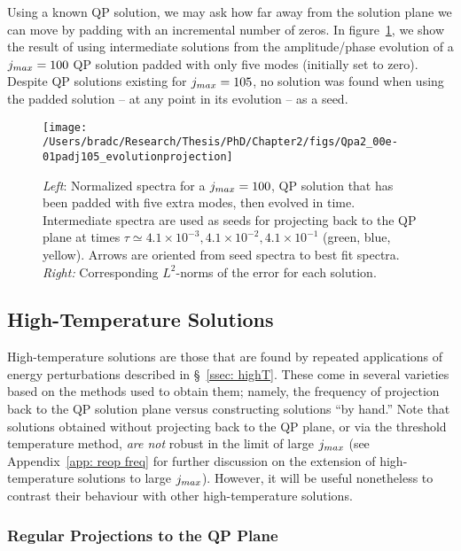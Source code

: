 \documentclass[../PhD.tex]{subfiles}
\begin{document}
Using a known QP solution, we may ask how far away from the solution plane we can move by padding with an incremental number of zeros. In figure~\ref{fig: Qpa2_00e-01padj105_evolutionprojection}, we show the result of using intermediate solutions from the amplitude/phase evolution of a $j_{max} = 100$ QP solution padded with only five modes (initially set to zero). Despite QP solutions existing for $j_{max} = 105$, no solution was found when using the padded solution -- at any point in its evolution -- as a seed.

\begin{figure}[ht]
	\centering
	\texttt{[image: /Users/bradc/Research/Thesis/PhD/Chapter2/figs/Qpa2\_00e-01padj105\_evolutionprojection]}
	\caption{{\it Left}: Normalized spectra for a $j_{max} = 100$, QP solution that has been padded with five extra modes, then evolved in time. Intermediate spectra are used as seeds for projecting back to the QP plane at times $\tau \simeq 4.1 \times 10^{-3}, 4.1 \times 10^{-2}, 4.1 \times 10^{-1}$ (green, blue, yellow). Arrows are oriented from seed spectra to best fit spectra. {\it Right:} Corresponding $L^2$-norms of the error for each solution.}
	\label{fig: Qpa2_00e-01padj105_evolutionprojection}
\end{figure}


\subsection{High-Temperature Solutions}

High-temperature solutions are those that are found by repeated applications of energy perturbations described in \S\!~\ref{ssec: highT}. These come in several varieties based on the methods used to obtain them; namely, the frequency of projection back to the QP solution plane versus constructing solutions ``by hand.'' Note that solutions obtained without projecting back to the QP plane, or via the threshold temperature method, \emph{are not} robust in the limit of large $j_{max}$ (see Appendix~\ref{app: reop freq} for further discussion on the extension of high-temperature solutions to large $j_{max}$). However, it will be useful nonetheless to contrast their behaviour with other high-temperature solutions.


\subsubsection{Regular Projections to the QP Plane}
\label{sssec: evo of regular projections}
\end{document}
